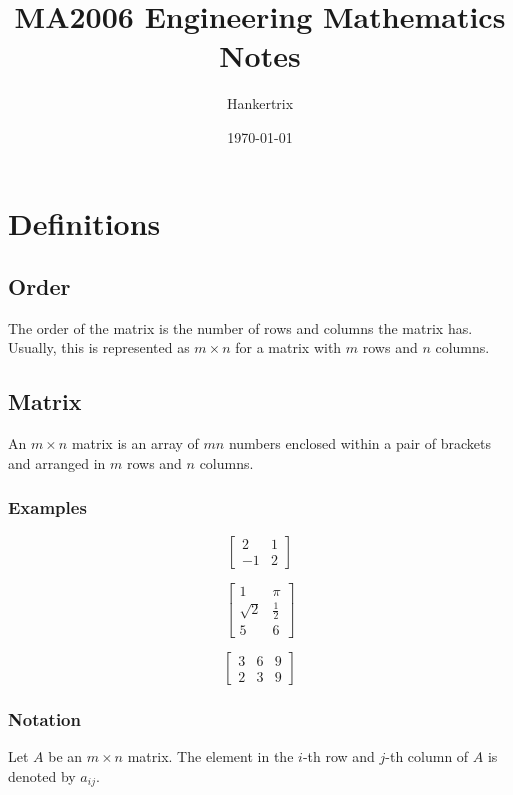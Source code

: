 \documentclass[11pt]{article}
\author{Hankertrix}
\date{\today}
\title{MA2006 Engineering Mathematics Notes}
\begin{document}
\maketitle
\setcounter{tocdepth}{2}
\tableofcontents \clearpage\section{Definitions}
\label{sec:orgcdcf2f3}

\subsection{Order}
\label{sec:orgc102d51}
The order of the matrix is the number of rows and columns the matrix has. Usually, this is represented as \(m \times n\) for a matrix with \(m\) rows and \(n\) columns.
\subsection{Matrix}
\label{sec:org746ffb2}
An \(m \times n\) matrix is an array of \(mn\) numbers enclosed within a pair of brackets and arranged in \(m\) rows and \(n\) columns.
\subsubsection{Examples}
\label{sec:org64d6fb7}
\begin{displaymath}
\begin{bmatrix}
2 & 1 \\
-1 & 2
\end{bmatrix}
\end{displaymath}

\begin{displaymath}
\begin{bmatrix}
1 & \pi \\
\sqrt{2} & \frac{1}{2} \\
5 & 6
\end{bmatrix}
\end{displaymath}

\begin{displaymath}
\begin{bmatrix}
3 & 6 & 9 \\
2 & 3 & 9
\end{bmatrix}
\end{displaymath}
\subsubsection{Notation}
\label{sec:org8314946}
Let \(A\) be an \(m \times n\) matrix. The element in the \(i\)-th row and \(j\)-th column of \(A\) is denoted by \(a_{ij}\).
\end{document}
